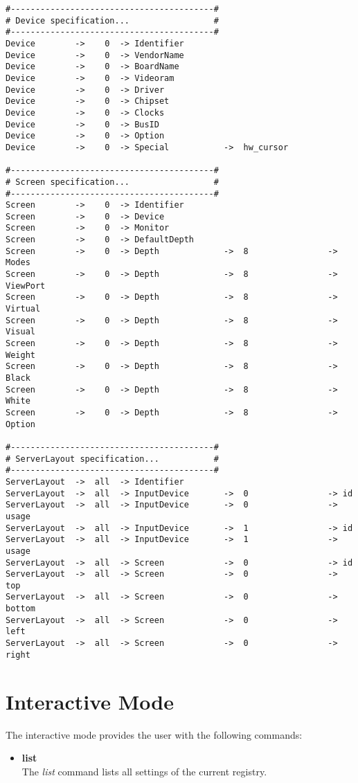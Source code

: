 \begin{appendix}
\begin{verbatim}
#-----------------------------------------#
# Device specification...                 #
#-----------------------------------------#
Device        ->    0  -> Identifier
Device        ->    0  -> VendorName
Device        ->    0  -> BoardName
Device        ->    0  -> Videoram
Device        ->    0  -> Driver
Device        ->    0  -> Chipset
Device        ->    0  -> Clocks
Device        ->    0  -> BusID
Device        ->    0  -> Option
Device        ->    0  -> Special           ->  hw_cursor

#-----------------------------------------#
# Screen specification...                 #
#-----------------------------------------#
Screen        ->    0  -> Identifier
Screen        ->    0  -> Device
Screen        ->    0  -> Monitor
Screen        ->    0  -> DefaultDepth
Screen        ->    0  -> Depth             ->  8                -> Modes
Screen        ->    0  -> Depth             ->  8                -> ViewPort
Screen        ->    0  -> Depth             ->  8                -> Virtual
Screen        ->    0  -> Depth             ->  8                -> Visual
Screen        ->    0  -> Depth             ->  8                -> Weight
Screen        ->    0  -> Depth             ->  8                -> Black
Screen        ->    0  -> Depth             ->  8                -> White
Screen        ->    0  -> Depth             ->  8                -> Option

#-----------------------------------------#
# ServerLayout specification...           #
#-----------------------------------------#
ServerLayout  ->  all  -> Identifier
ServerLayout  ->  all  -> InputDevice       ->  0                -> id
ServerLayout  ->  all  -> InputDevice       ->  0                -> usage
ServerLayout  ->  all  -> InputDevice       ->  1                -> id
ServerLayout  ->  all  -> InputDevice       ->  1                -> usage
ServerLayout  ->  all  -> Screen            ->  0                -> id
ServerLayout  ->  all  -> Screen            ->  0                -> top
ServerLayout  ->  all  -> Screen            ->  0                -> bottom
ServerLayout  ->  all  -> Screen            ->  0                -> left
ServerLayout  ->  all  -> Screen            ->  0                -> right
\end{verbatim} 


\section{Interactive Mode}
The interactive mode provides the user with the following commands:
\begin{itemize}
\item  \textbf{list}\\
       The \textit{list} command lists all settings of the current registry.


\end{itemize}
\end{appendix}
